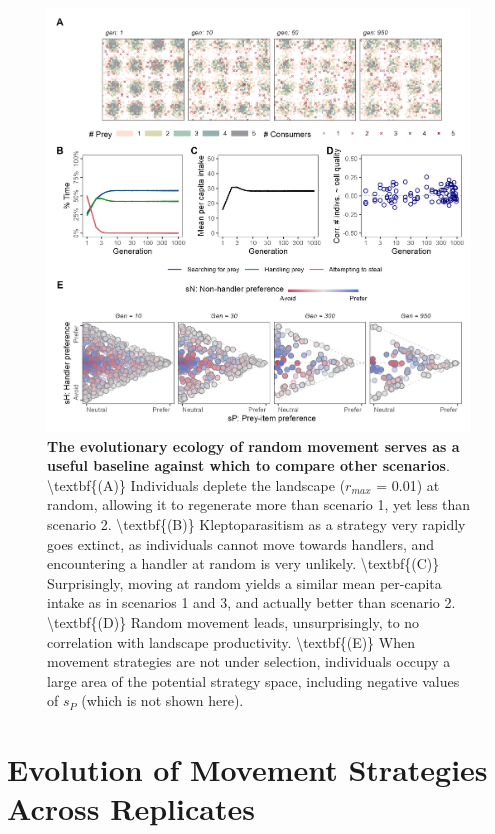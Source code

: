 \documentclass[]{scrartcl}
\begin{document}
\begin{figure}
\centering
\includegraphics{"figures/fig_0random.png"}
\caption{\textbf{The evolutionary ecology of random movement serves as a useful baseline against which to compare other scenarios}. \textbackslash{}textbf\{(A)\} Individuals deplete the landscape (\(r_{max}\) = 0.01) at random, allowing it to regenerate more than scenario 1, yet less than scenario 2. \textbackslash{}textbf\{(B)\} Kleptoparasitism as a strategy very rapidly goes extinct, as individuals cannot move towards handlers, and encountering a handler at random is very unlikely. \textbackslash{}textbf\{(C)\} Surprisingly, moving at random yields a similar mean per-capita intake as in scenarios 1 and 3, and actually better than scenario 2. \textbackslash{}textbf\{(D)\} Random movement leads, unsurprisingly, to no correlation with landscape productivity. \textbackslash{}textbf\{(E)\} When movement strategies are not under selection, individuals occupy a large area of the potential strategy space, including negative values of \(s_P\) (which is not shown here).}
\end{figure}

\newpage

\hypertarget{evolution-of-movement-strategies-across-replicates}{%
\section{Evolution of Movement Strategies Across Replicates}\label{evolution-of-movement-strategies-across-replicates}}
\end{document}
